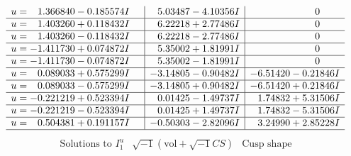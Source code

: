\documentclass[1p]{elsarticle_modified}
\theoremstyle{definition}
\newcommand{\I}{\sqrt{-1}}
\begin{document}
$$\begin{array}{c|c|c}
\begin{aligned}
u &= \phantom{-}1.366840 - 0.185574 I\end{aligned}
 & \phantom{-}5.03487 - 4.10356 I & \phantom{-0.000000 } 0 \\ \hline\begin{aligned}
u &= \phantom{-}1.403260 + 0.118432 I\end{aligned}
 & \phantom{-}6.22218 + 2.77486 I & \phantom{-0.000000 } 0 \\ \hline\begin{aligned}
u &= \phantom{-}1.403260 - 0.118432 I\end{aligned}
 & \phantom{-}6.22218 - 2.77486 I & \phantom{-0.000000 } 0 \\ \hline\begin{aligned}
u &= -1.411730 + 0.074872 I\end{aligned}
 & \phantom{-}5.35002 + 1.81991 I & \phantom{-0.000000 } 0 \\ \hline\begin{aligned}
u &= -1.411730 - 0.074872 I\end{aligned}
 & \phantom{-}5.35002 - 1.81991 I & \phantom{-0.000000 } 0 \\ \hline\begin{aligned}
u &= \phantom{-}0.089033 + 0.575299 I\end{aligned}
 & -3.14805 - 0.90482 I & -6.51420 - 0.21846 I \\ \hline\begin{aligned}
u &= \phantom{-}0.089033 - 0.575299 I\end{aligned}
 & -3.14805 + 0.90482 I & -6.51420 + 0.21846 I \\ \hline\begin{aligned}
u &= -0.221219 + 0.523394 I\end{aligned}
 & \phantom{-}0.01425 - 1.49737 I & \phantom{-}1.74832 + 5.31506 I \\ \hline\begin{aligned}
u &= -0.221219 - 0.523394 I\end{aligned}
 & \phantom{-}0.01425 + 1.49737 I & \phantom{-}1.74832 - 5.31506 I \\ \hline\begin{aligned}
u &= \phantom{-}0.504381 + 0.191157 I\end{aligned}
 & -0.50303 - 2.82096 I & \phantom{-}3.24990 + 2.85228 I\\
 \hline 
 \end{array}$$\newpage$$\begin{array}{c|c|c}  
\text{Solutions to }I^u_{1}& \I (\text{vol} + \sqrt{-1}CS) & \text{Cusp shape}\\

\end{array}$$
\end{document}
